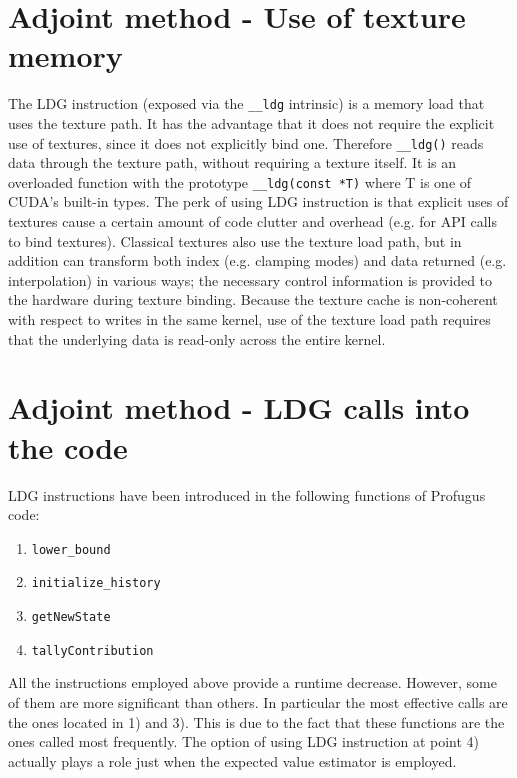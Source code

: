 \documentclass[a4paper,10pt]{article}
\begin{document}
\section{Adjoint method - Use of texture memory}


The LDG instruction (exposed via the \texttt{\_\_ldg} intrinsic) is a memory 
load that uses the texture path. 
It has the advantage that it does not require the explicit use of textures, 
since it does not 
explicitly bind one. 
Therefore \texttt{\_\_ldg()} reads data through the texture path, without 
requiring a texture itself. 
It is an overloaded function with the prototype \texttt{\_\_ldg(const *T)} 
where T is one of CUDA's built-in types. 
The perk of using LDG instruction is that explicit uses of textures cause a 
certain 
amount of code clutter and overhead (e.g. for API calls to bind textures).
Classical textures also use the texture load path, but in addition can transform 
both index (e.g. clamping modes) 
and data returned (e.g. interpolation) in various ways; the necessary control 
information 
is provided to the hardware during texture binding.
Because the texture cache is non-coherent with 
respect to writes in the same kernel, use of the texture load path requires that 
the underlying data 
is read-only across the entire kernel.



\section{Adjoint method - LDG calls into the code}

LDG instructions have been introduced in the following functions of Profugus 
code:

\begin{enumerate}
 \item \texttt{lower\_bound}
 \item \texttt{initialize\_history}
 \item \texttt{getNewState}
 \item \texttt{tallyContribution}
\end{enumerate}


All the instructions employed above provide a runtime decrease. However, some of 
them are more
significant than others. In particular the most effective calls are the ones 
located in
1) and 3). This is due to the fact that these functions are the ones called most 
frequently.
The option of using LDG instruction at point 4) actually plays a role just when 
the expected value
estimator is employed.
\end{document}
